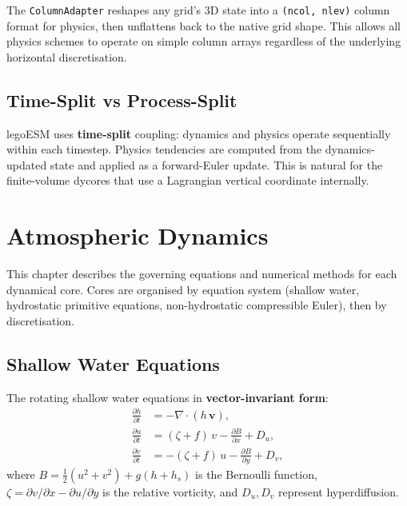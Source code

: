 \documentclass[11pt,twoside]{report}
\newcommand{\pp}{\partial}
\newcommand{\half}{\tfrac{1}{2}}
\newcommand{\vect}[1]{\bm{#1}}
\newcommand{\divg}{\nabla\!\cdot\!}
\begin{document}
The \texttt{ColumnAdapter} reshapes any grid's 3D state into a
\texttt{(ncol, nlev)} column format for physics, then unflattens back
to the native grid shape.  This allows all physics schemes to operate
on simple column arrays regardless of the underlying horizontal
discretisation.

\section{Time-Split vs Process-Split}

legoESM uses \textbf{time-split} coupling: dynamics and physics operate
sequentially within each timestep.  Physics tendencies are computed from
the dynamics-updated state and applied as a forward-Euler update.  This
is natural for the finite-volume dycores that use a Lagrangian vertical
coordinate internally.


\chapter{Atmospheric Dynamics}
\label{ch:dynamics}

This chapter describes the governing equations and numerical methods for each
dynamical core.  Cores are organised by equation system (shallow water,
hydrostatic primitive equations, non-hydrostatic compressible Euler),
then by discretisation.

\section{Shallow Water Equations}
\label{sec:sw}

The rotating shallow water equations in \textbf{vector-invariant form}:
\begin{align}
  \frac{\pp h}{\pp t} &= -\divg(h\,\vect{v}),
  \label{eq:sw-mass}\\
  \frac{\pp u}{\pp t} &= (\zeta+f)\,v - \frac{\pp B}{\pp x} + D_u,
  \label{eq:sw-u}\\
  \frac{\pp v}{\pp t} &= -(\zeta+f)\,u - \frac{\pp B}{\pp y} + D_v,
  \label{eq:sw-v}
\end{align}
where $B=\half(u^2+v^2)+g(h+h_s)$ is the Bernoulli function,
$\zeta=\pp v/\pp x - \pp u/\pp y$ is the relative vorticity,
and $D_u,D_v$ represent hyperdiffusion.
\end{document}
